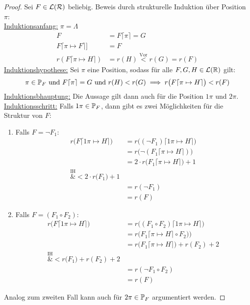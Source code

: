 \begin{proof}
	Sei $F\in\L(\RR)$ beliebig.
	Beweis durch strukturelle Induktion über Position $\pi$:\\
	\ul{Induktionsanfang:} $\pi=\Lambda$
	\begin{align*}
		F&=F\lceil\pi\rceil=G\\
		F\lceil\pi\mapsto F\rceil]&=F\\
		r(F\lceil\pi\mapsto H\rceil)&=r(H)\stackrel{\text{Vor}}{<}r(G)=r(F)
	\end{align*}
	\ul{Induktionshypothese:} Sei $\pi$ eine Position, sodass für alle $F,G,H\in\L(\R)$ gilt:
	\begin{align*}
		\pi\in\P_F\text{ und }F\lceil\pi\rceil=G\text{ und } r(H)<r(G)\implies r\big(F\lceil\pi\mapsto H\rceil\big)<r(F)
	\end{align*}
	\ul{Induktionsbhauptung:} Die Aussage gilt dann auch für die Position $1\pi$ und $2\pi$.\nl
	\ul{Induktionsschritt:} Falls $1\pi\in\P_F$, dann gibt es zwei Möglichkeiten für die Struktur von $F$:
	\begin{enumerate}
		\item Falls $F=\neg F_1$:
			\begin{align*}
				r\big(F\lceil1\pi\mapsto H\rceil\big)
				&=r\big((\neg F_1)\lceil1\pi\mapsto H\rceil\big)\\
				&=r\big(\neg(F_1\lceil\pi\mapsto H\rceil)\big)\\
				&=2\cdot r\big(F_1\lceil\pi\mapsto H\rceil\big)+1\\
				\overset{\text{IH}}&{<}
				2\cdot r\big(F_1\big)+1\\
				&=r(\neg F_1)\\
				&=r(F)
			\end{align*}
		\item Falls $F=(F_1\circ F_2)$:
			\begin{align*}
				r\big(F\lceil1\pi\mapsto H\rceil\big)
				&=r\big((F_1\circ F_2)\lceil1\pi\mapsto H\rceil\big)\\
				&=r\big(F_1\lceil\pi\mapsto H\rceil\circ F_2)\big)\\
				&=r\big(F_1\lceil\pi\mapsto H\rceil\big)+r(F_2)+2\\
				\overset{\text{IH}}&{<}
				r\big(F_1\big)+r(F_2)+2\\
				&=r(\neg F_1\circ F_2)\\
				&=r(F)
			\end{align*}
	\end{enumerate}
	Analog zum zweiten Fall kann auch für $2\pi\in\P_F$ argumentiert werden.
\end{proof}
